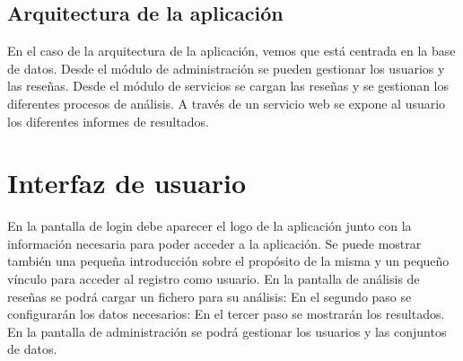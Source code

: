 \subsection{Arquitectura de la aplicación}

En el caso de la arquitectura de la aplicación, vemos que está centrada en la base de datos.
Desde el módulo de administración se pueden gestionar los usuarios y las reseñas.
Desde el módulo de servicios se cargan las reseñas y se gestionan los diferentes procesos de análisis.
A través de un servicio web se expone al usuario los diferentes informes de resultados.


\newpage

\section{Interfaz de usuario}
En la pantalla de login debe aparecer el logo de la aplicación 
junto con la información necesaria para poder acceder a la aplicación.
Se puede mostrar también una pequeña introducción sobre el propósito de la misma y 
un pequeño vínculo para acceder al registro como usuario.
En la pantalla de análisis de reseñas se podrá cargar un fichero para su análisis:
En el segundo paso se configurarán los datos necesarios:
En el tercer paso se mostrarán los resultados.
En la pantalla de administración se podrá gestionar los usuarios y las conjuntos de datos.
